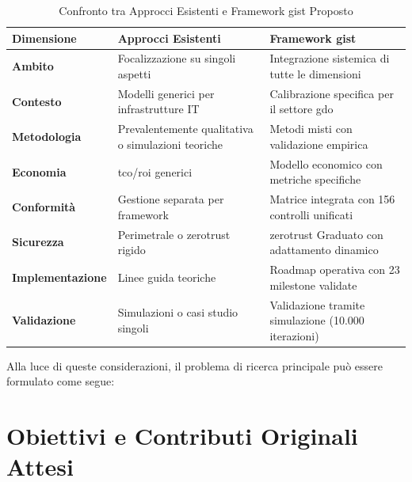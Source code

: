\begin{table}[htbp]
\centering
\small
\caption{Confronto tra Approcci Esistenti e Framework \gls{gist} Proposto}
\label{tab:confronto_approcci}
\begin{tabularx}{\textwidth}{@{}lXX@{}}
\toprule
\textbf{Dimensione} & \textbf{Approcci Esistenti} & \textbf{Framework \gls{gist}} \\
\midrule
\textbf{Ambito} & Focalizzazione su singoli aspetti & Integrazione sistemica di tutte le dimensioni \\
\textbf{Contesto} & Modelli generici per infrastrutture IT & Calibrazione specifica per il settore \gls{gdo} \\
\textbf{Metodologia} & Prevalentemente qualitativa o simulazioni teoriche & Metodi misti con validazione empirica \\
\textbf{Economia} & \gls{tco}/\gls{roi} generici & Modello economico con metriche specifiche \\
\textbf{Conformità} & Gestione separata per framework & Matrice integrata con 156 controlli unificati \\
\textbf{Sicurezza} & Perimetrale o \gls{zerotrust} rigido & \gls{zerotrust} Graduato con adattamento dinamico \\
\textbf{Implementazione} & Linee guida teoriche & Roadmap operativa con 23 milestone validate \\
\textbf{Validazione} & Simulazioni o casi studio singoli & Validazione tramite simulazione (10.000 iterazioni) \\
\bottomrule
\end{tabularx}
\end{table}

Alla luce di queste considerazioni, il problema di ricerca principale può essere formulato come segue:

\begin{center}
\end{center}

\section{\texorpdfstring{Obiettivi e Contributi Originali Attesi}{1.3 - Obiettivi e Contributi Originali Attesi}}
\label{sec:obiettivi}

